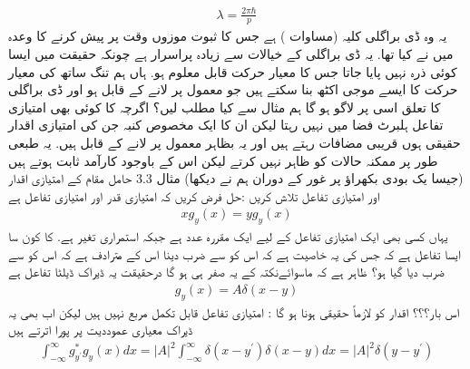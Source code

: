 \begin{align}
\lambda = \frac{2\pi\hbar}{p} 
\end{align}
یہ وہ ڈی براگلی کلیہ (مساوات  ) ہے جس کا ثبوت موزوں وقت پر پیش کرنے کا وعدہ میں نے کیا تھا. یہ ڈی براگلی کے خیالات سے زیادہ پراسرار ہے چونکہ حقیقت میں ایسا کوئی ذرہ نہیں پایا جاتا جس کا معیار حرکت قابل معلوم ہو. ہاں ہم تنگ ساتھ کی معیار حرکت کا ایسے موجی اکٹھ بنا سکتے ہیں جو معمول پر لانے کے قابل ہو اور ڈی براگلی کا تعلق اسی پر لاگو ہو گا
ہم مثال  سے کیا مطلب لیں؟ اگرچہ  کا کوئی بھی امتیازی تفاعل ہلبرٹ فضا میں نہیں رہتا لیکن ان کا ایک مخصوص کنبہ جن کی امتیازی اقدار حقیقی ہوں قریبی مضافات رہتے ہیں اور یہ بظاہر معمول پر لانے کے قابل ہیں. یہ طبعی طور پر ممکنہ حالات کو ظاہر نہیں کرتے لیکن اس کے باوجود کارآمد ثابت ہوتے ہیں (جیسا یک بودی بکھراؤ پر غور کے دوران ہم نے دیکھا)
مثال 3.3
حامل مقام کے امتیازی اقدار اور امتیازی تفاعل تلاش کریں
:حل
فرض کریں کہ  امتیازی قدر اور  امتیازی تفاعل ہے
\begin{align}
xg_{y}(x) = yg_{y}(x) 
\end{align}
یہاں کسی بھی ایک امتیازی تفاعل کے لیے  ایک مقررہ عدد ہے جبکہ  استمراری تغیر ہے. کا کون سا ایسا تفاعل ہے کہ جس کی یہ خاصیت ہے کہ اس کو  سے ضرب دینا اس کے مترادف ہے کہ اس کو  سے ضرب دیا گیا ہو؟ ظاہر ہے کہ ماسوائےنکتہ  کے یہ صفر ہی ہو گا درحقیقت یہ ڈیراک ڈیلٹا تفاعل ہے
\begin{align*}
g_{y}(x) = A\delta(x-y)
\end{align*}
اس بار؟؟؟ اقدار کو لازماً حقیقی ہونا ہو گا : امتیازی تفاعل قابل تکمل مربع نہیں ہیں لیکن اب بھی یہ ڈیراک معیاری عموددیت پر پورا اترتے ہیں
\begin{align}
\int_{-\infty}^{\infty}g_{y^{'}}^{*}g_{y}(x) dx = |A|^{2}\int_{-\infty}^{\infty}\delta(x-y^{'})\delta(x-y) dx = |A|^{2} \delta (y-y^{'})
\end{align}


